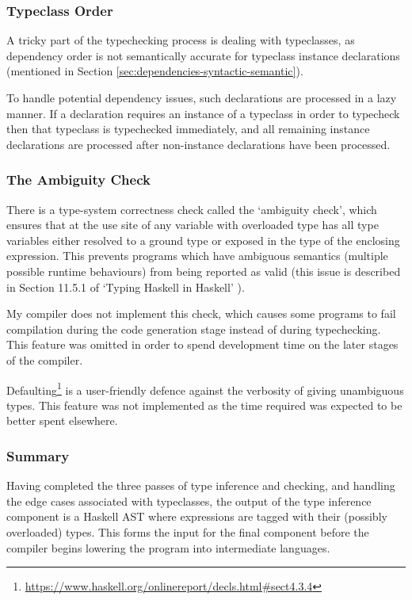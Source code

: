 \documentclass[dissertation.tex]{subfiles}
\begin{document}
{{        \subsubsection*{Typeclass Order}\label{sec:typeclass-order}
        {
            A tricky part of the typechecking process is dealing with typeclasses, as dependency order is not semantically accurate for typeclass instance declarations (mentioned in Section \ref{sec:dependencies-syntactic-semantic}).
            
            To handle potential dependency issues, such declarations are processed in a lazy manner. If a declaration requires an instance of a typeclass in order to typecheck then that typeclass is typechecked immediately, and all remaining instance declarations are processed after non-instance declarations have been processed.
        }
        \subsubsection*{The Ambiguity Check}
        {
            There is a type-system correctness check called the `ambiguity check', which ensures that at the use site of any variable with overloaded type has all type variables either resolved to a ground type or exposed in the type of the enclosing expression. This prevents programs which have ambiguous semantics (multiple possible runtime behaviours) from being reported as valid (this issue is described in Section 11.5.1 of `Typing Haskell in Haskell' \cite{THIH}). 

            My compiler does not implement this check, which causes some programs to fail compilation during the code generation stage instead of during typechecking. This feature was omitted in order to spend development time on the later stages of the compiler.

            Defaulting\footnote{\url{https://www.haskell.org/onlinereport/decls.html\#sect4.3.4}} is a user-friendly defence against the verbosity of giving unambiguous types. This feature was not implemented as the time required was expected to be better spent elsewhere.
        }
        \subsubsection*{Summary}
        {
            Having completed the three passes of type inference and checking, and handling the edge cases associated with typeclasses, the output of the type inference component is a Haskell AST where expressions are tagged with their (possibly overloaded) types. This forms the input for the final component before the compiler begins lowering the program into intermediate languages.   
        }
    }
}
\end{document}

